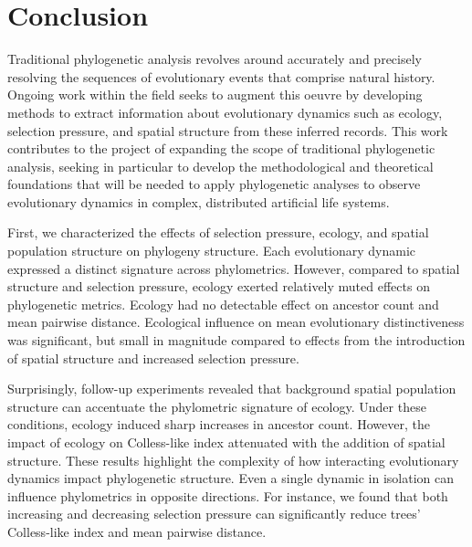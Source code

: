 \section{Conclusion}
\label{sec:conclusion}

Traditional phylogenetic analysis revolves around accurately and precisely resolving the sequences of evolutionary events that comprise natural history.
Ongoing work within the field seeks to augment this oeuvre by developing methods to extract information about evolutionary dynamics such as ecology, selection pressure, and spatial structure from these inferred records.
This work contributes to the project of expanding the scope of traditional phylogenetic analysis, seeking in particular to develop the methodological and theoretical foundations that will be needed to apply phylogenetic analyses to observe evolutionary dynamics in complex, distributed artificial life systems.

First, we characterized the effects of selection pressure, ecology, and spatial population structure on phylogeny structure.
Each evolutionary dynamic expressed a distinct signature across phylometrics.
However, compared to spatial structure and selection pressure, ecology exerted relatively muted effects on phylogenetic metrics.
Ecology had no detectable effect on ancestor count and mean pairwise distance.
Ecological influence on mean evolutionary distinctiveness was significant, but small in magnitude compared to effects from the introduction of spatial structure and increased selection pressure.

Surprisingly, follow-up experiments revealed that background spatial population structure can accentuate the phylometric signature of ecology.
Under these conditions, ecology induced sharp increases in ancestor count.
However, the impact of ecology on Colless-like index attenuated with the addition of spatial structure.
These results highlight the complexity of how interacting evolutionary dynamics impact phylogenetic structure.
Even a single dynamic in isolation can influence phylometrics in opposite directions.
For instance, we found that both increasing and decreasing selection pressure can significantly reduce trees' Colless-like index and mean pairwise distance.

